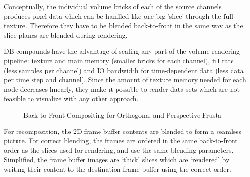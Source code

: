 \documentclass[10pt,a4]{scrartcl}
\begin{document}
Conceptually, the individual volume bricks of each of the source
channels produces pixel data which can be handled like one big 'slice'
through the full texture. Therefore they have to be blen\-ded
back-to-front in the same way as the slice planes are blended during
rendering.

DB compounds have the advantage of scaling any part of the volume
rendering pipeline: texture and main memory (smaller bricks for each
channel), fill rate (less samples per channel) and IO bandwidth for
time-dependent data (less data per time step and channel). Since the
amount of texture memory needed for each node decreases linearly, they
make it possible to render data sets which are not feasible to
visualize with any other approach.

\begin{figure}[h!t]
  \hfil
  {\caption{\label{fBlend}Back-to-Front Com\-po\-siting for
      Orthogonal and Perspective Frusta}}
\end{figure}

For recomposition, the 2D frame buffer contents are blended to form a
seamless picture. For correct blending, the frames are ordered in the
same back-to-front order as the slices used for rendering, and use the
same blending parameters. Simplified, the frame buffer images are
`thick' slices which are `rendered' by writing their content to the
destination frame buffer using the correct order.
\end{document}
